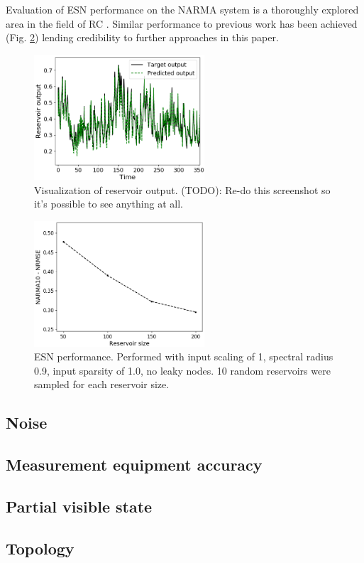 Evaluation of ESN performance on the NARMA system is a thoroughly explored area
in the field of RC \cite{verstraeten_experimental_2007, rodan_minimum_2011,
jaeger_adaptive_nodate}. Similar performance to previous work has been achieved
(Fig. \ref{performance}) lending credibility to further approaches in this
paper.

\begin{figure}[H]
  \centering
  \includegraphics[width=2.5in]{img/narma_visualization.png}
  \caption{
    Visualization of reservoir output. (TODO): Re-do this screenshot so it's
possible to see anything at all.
  }
  \label{visualization}
\end{figure}

\begin{figure}[H]
  \centering
  \includegraphics[width=2.5in]{img/general_performance.png}
  \caption{
    ESN performance. Performed with input scaling of 1, spectral radius 0.9,
input sparsity of 1.0, no leaky nodes. 10 random reservoirs were sampled for
each reservoir size.
  }
  \label{performance}
\end{figure}

\subsection{Noise}

\subsection{Measurement equipment accuracy}

\subsection{Partial visible state}

\subsection{Topology}



